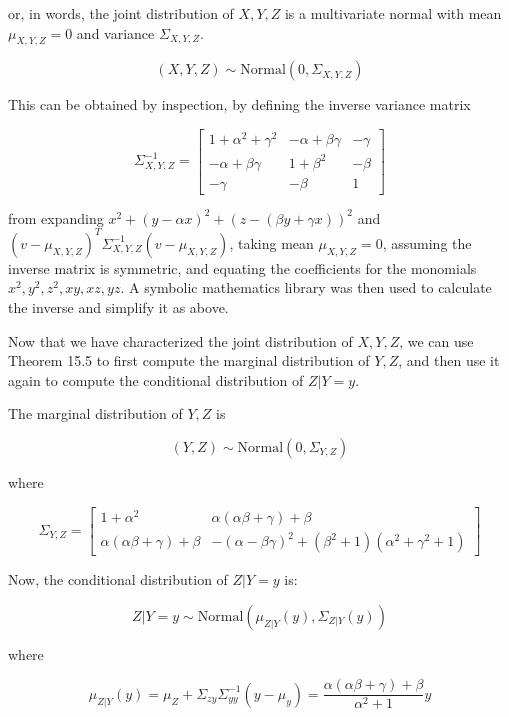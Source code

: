or, in words, the joint distribution of \(X, Y, Z\) is a multivariate
normal with mean \(\mu_{X, Y, Z} = 0\) and variance
\(\Sigma_{X, Y, Z}\).

\[ (X, Y, Z) \sim \text{Normal}(0, \Sigma_{X, Y, Z}) \]

This can be obtained by inspection, by defining the inverse variance
matrix

\[
\Sigma_{X, Y, Z}^{-1} = \begin{bmatrix}
1 + \alpha^{2} + \gamma^{2} & -\alpha + \beta \gamma & -\gamma \\
-\alpha + \beta \gamma  & 1 + \beta^{2}            & -\beta  \\
-\gamma                 & -\beta                 & 1
\end{bmatrix}
\]

from expanding \(x^{2} + (y - \alpha x)^{2} + (z - (\beta y + \gamma x))^{2}\)
and \((v - \mu_{X, Y, Z})^T \Sigma_{X, Y, Z}^{-1} (v - \mu_{X, Y, Z})\),
taking mean \(\mu_{X, Y, Z} = 0\), assuming the inverse matrix is
symmetric, and equating the coefficients for the monomials
\(x^{2}, y^{2}, z^{2}, xy, xz, yz\). A symbolic mathematics library was then
used to calculate the inverse and simplify it as above.

Now that we have characterized the joint distribution of \(X, Y, Z\), we
can use Theorem 15.5 to first compute the marginal distribution of
\(Y, Z\), and then use it again to compute the conditional distribution
of \(Z | Y = y\).

The marginal distribution of \(Y, Z\) is

\[ (Y, Z) \sim \text{Normal}(0, \Sigma_{Y, Z})\]

where

\[ \Sigma_{Y, Z} = \begin{bmatrix}
1 + \alpha^{2} & \alpha(\alpha \beta + \gamma) + \beta \\
\alpha(\alpha \beta + \gamma) + \beta & -(\alpha - \beta\gamma)^{2} + (\beta^{2} + 1)(\alpha^{2} + \gamma^{2} + 1)
\end{bmatrix} \]

Now, the conditional distribution of \(Z | Y = y\) is:

\[ Z | Y = y \sim \text{Normal}(\mu_{Z | Y} (y), \Sigma_{Z | Y}(y)) \]

where

\[ \mu_{Z | Y}(y) = \mu_Z + \Sigma_{zy} \Sigma_{yy}^{-1} (y - \mu_y) = \frac{\alpha(\alpha \beta + \gamma) + \beta}{\alpha^{2} + 1} y\]

